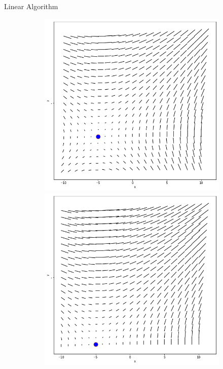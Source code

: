 \documentclass{beamer}
\begin{document}
\begin{frame}{Linear Algorithm}
\begin{itemize}
\begin{figure}[h]
\begin{subfigure}[b]{0.4\textwidth}
\begin{minipage}{.5\textwidth}
		\end{minipage}
	\end{subfigure}
	
	
	\begin{subfigure}[b]{0.4\textwidth}
		\begin{minipage}{.5\textwidth}
			\centering
			\includegraphics[width= 0.8\linewidth]{images/crit_adj3.png}
			
		\end{minipage}%
		\begin{minipage}{.5\textwidth}
			\centering
			\includegraphics[width=.8\linewidth]{images/crit_adj4.png}
			

\end{minipage}
\end{subfigure}
\end{figure}
\end{itemize}
\end{frame}
\end{document}
